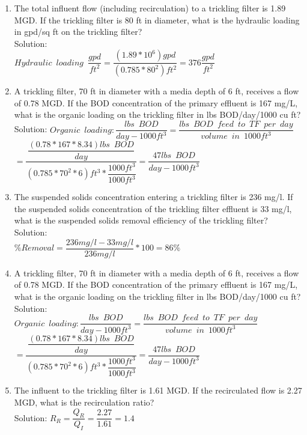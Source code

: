 \documentclass{article}
\begin{document}
\begin{enumerate}


\item The total influent flow (including recirculation) to a trickling filter is 1.89 MGD. If the trickling filter is 80 ft in diameter, what is the hydraulic loading in gpd/sq ft on the trickling filter?\\
Solution:\\
$Hydraulic \enspace loading \enspace \dfrac{gpd}{ft^2}=\dfrac{(1.89*10^6)gpd}{(0.785*80^2)ft^2} =\boxed{376\dfrac{gpd}{ft^2}}$

\item A trickling filter, 70 ft in diameter with a media depth of 6 ft, receives a flow of 0.78 MGD. If the BOD concentration of the primary effluent is 167 mg/L, what is the organic loading on the trickling filter in lbs BOD/day/1000 cu ft?\\
Solution:  $Organic \enspace loading:\dfrac{lbs \enspace BOD}{day-1000ft^3}=\dfrac{lbs \enspace BOD \enspace feed \enspace to \enspace TF \enspace per \enspace day}{volume \enspace in \enspace 1000ft^3}$\\
$=\dfrac{\dfrac{(0.78*167*8.34)lbs \enspace BOD}{day}}{(0.785*70^2*6)ft^3*\dfrac{1000ft^3}{1000ft^3}}=\boxed{\dfrac{47 lbs \enspace BOD}{day-1000 ft^3}}$

\item The suspended solids concentration entering a trickling filter is 236 mg/l. If the suspended solids concentration of the trickling filter effluent is 33 mg/l, what is the suspended solids removal efficiency of the trickling filter?\\
Solution:\\
$\% Removal=\dfrac{236 mg/l-33 mg/l}{236 mg/l}*100=\boxed{86\%}$


\item A trickling filter, 70 ft in diameter with a media depth of 6 ft, receives a flow of 0.78 MGD. If the BOD concentration of the primary effluent is 167 mg/L, what is the organic loading on the trickling filter in lbs BOD/day/1000 cu ft?\\
Solution:\\
$Organic \enspace loading:\dfrac{lbs \enspace BOD}{day-1000ft^3}=\dfrac{lbs \enspace BOD \enspace feed \enspace to \enspace TF \enspace per \enspace day}{volume \enspace in \enspace 1000ft^3}$\\
$=\dfrac{\dfrac{(0.78*167*8.34)lbs \enspace BOD}{day}}{(0.785*70^2*6)ft^3*\dfrac{1000ft^3}{1000ft^3}}=\boxed{\dfrac{47 lbs \enspace BOD}{day-1000 ft^3}}$

\item The influent to the trickling filter is 1.61 MGD. If the recirculated flow is 2.27 MGD, what is the recirculation ratio?\\
Solution:  $R_R=\dfrac{Q_R}{Q_I}=\dfrac{2.27}{1.61}=\boxed{1.4}$\\









\end{enumerate}
\end{document}
